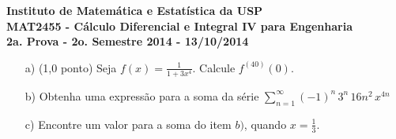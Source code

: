 \documentclass[12pt,a4paper]{article}
\begin{document}
\newpage
\begin{center}
\textbf{Instituto de Matemática e Estatística da USP\\
MAT2455 - Cálculo Diferencial e Integral IV para Engenharia\\}
\textbf{2a. Prova - 2o. Semestre 2014 - 13/10/2014}
\end{center}


\begin{itemize}
	\item[a)] (1,0 ponto) Seja $ f(x) = \displaystyle\frac{1}{1+3x^4}$. Calcule $f^{(40)}(0)$.
	
	\item[b)] Obtenha uma expressão para a soma da série $\displaystyle\sum_{n=1}^\infty (-1)^n \, 3^n \, 16 n^2 \, x^{4n}$ 
	\item[c)] Encontre um valor para a soma do item $b)$, quando $x = \displaystyle\frac{1}{3}$.
\end{itemize}
\end{document}
